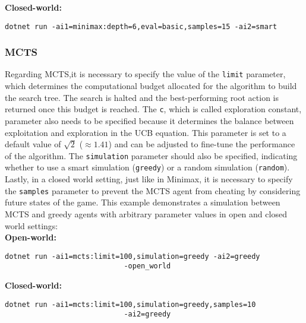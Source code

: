 \textbf{Closed-world: }
\begin{lstlisting}
dotnet run -ai1=minimax:depth=6,eval=basic,samples=15 -ai2=smart
\end{lstlisting}

\subsubsection{MCTS}

Regarding MCTS,it is necessary to specify the value of the \texttt{limit} parameter, which determines the computational budget allocated for the algorithm to build the search tree. The search is halted and the best-performing root action is returned once this budget is reached. The \texttt{c}, which is called exploration constant, parameter also needs to be specified because it determines the balance between exploitation and exploration in the UCB equation. This parameter is set to a default value of  $\sqrt{2}$ ($\approx 1.41$) and can be adjusted to fine-tune the performance of the algorithm. The \texttt{simulation} parameter should also be specified, indicating whether to use a smart simulation (\texttt{greedy}) or a random simulation (\texttt{random}). Lastly, in a closed world setting, just like in Minimax, it is necessary to specify the \texttt{samples} parameter to prevent the MCTS agent from cheating by considering future states of the game. This example demonstrates a simulation between MCTS and greedy agents with arbitrary parameter values in open and closed world settings: \\

\textbf{Open-world: }
\begin{lstlisting}
dotnet run -ai1=mcts:limit=100,simulation=greedy -ai2=greedy 
							-open_world
\end{lstlisting}

\textbf{Closed-world: }
\begin{lstlisting}
dotnet run -ai1=mcts:limit=100,simulation=greedy,samples=10 
							-ai2=greedy
\end{lstlisting}






